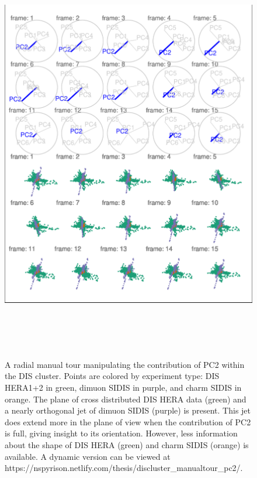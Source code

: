 \begin{Schunk}
\begin{figure}

{\centering \includegraphics[width=6in,height=7.2in]{spinifex_paper_files/figure-latex/DISclusterBad-1} 

}

\caption[A radial manual tour manipulating the contribution of PC2 within the DIS cluster]{A radial manual tour manipulating the contribution of PC2 within the DIS cluster. Points are colored by experiment type: DIS HERA1+2 in green, dimuon SIDIS in purple, and charm SIDIS in orange. The plane of cross distributed DIS HERA data (green) and a nearly orthogonal jet of dimuon SIDIS (purple) is present. This jet does extend more in the plane of view when the contribution of PC2 is full, giving insight to its orientation. However, less information about the shape of DIS HERA (green) and charm SIDIS (orange) is available. A dynamic version can be viewed at https://nspyrison.netlify.com/thesis/discluster\_manualtour\_pc2/.}\label{fig:DISclusterBad}
\end{figure}
\end{Schunk}

